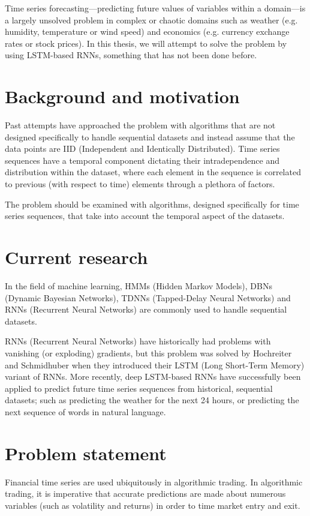 Time series forecasting---predicting future values of variables within a domain---is a largely unsolved problem in complex or chaotic domains such as weather (e.g. humidity, temperature or wind speed) and economics (e.g. currency exchange rates or stock prices). In this thesis, we will attempt to solve the problem by using LSTM-based RNNs, something that has not been done before.

\section{Background and motivation}
Past attempts have approached the problem with algorithms that are not designed specifically to handle sequential datasets and instead assume that the data points are IID (Independent and Identically Distributed). Time series sequences have a temporal component dictating their intradependence and distribution within the dataset, where each element in the sequence is correlated to previous (with respect to time) elements through a plethora of factors.

The problem should be examined with algorithms, designed specifically for time series sequences, that take into account the temporal aspect of the datasets.

\section{Current research}
In the field of machine learning, HMMs (Hidden Markov Models), DBNs (Dynamic Bayesian Networks), TDNNs (Tapped-Delay Neural Networks) and RNNs (Recurrent Neural Networks) are commonly used to handle sequential datasets.

RNNs (Recurrent Neural Networks) have historically had problems with vanishing (or exploding) gradients, but this problem was solved by Hochreiter and Schmidhuber when they introduced their LSTM (Long Short-Term Memory) variant of RNNs. More recently, deep LSTM-based RNNs have successfully been applied to predict future time series sequences from historical, sequential datasets; such as predicting the weather for the next 24 hours, or predicting the next sequence of words in natural language.

\section{Problem statement}
Financial time series are used ubiquitously in algorithmic trading. In algorithmic trading, it is imperative that accurate predictions are made about numerous variables (such as volatility and returns) in order to time market entry and exit.


